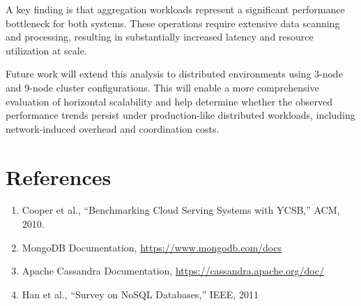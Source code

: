 \documentclass[12pt]{article}
\begin{document}
A key finding is that aggregation workloads represent a significant performance bottleneck for both systems. These operations require extensive data scanning and processing, resulting in substantially increased latency and resource utilization at scale.

Future work will extend this analysis to distributed environments using 3-node and 9-node cluster configurations. This will enable a more comprehensive evaluation of horizontal scalability and help determine whether the observed performance trends persist under production-like distributed workloads, including network-induced overhead and coordination costs.

\section{References}

\begin{enumerate}
\item Cooper et al., ``Benchmarking Cloud Serving Systems with YCSB,'' ACM, 2010.
\item MongoDB Documentation, \url{https://www.mongodb.com/docs}
\item Apache Cassandra Documentation, \url{https://cassandra.apache.org/doc/}
\item Han et al., ``Survey on NoSQL Databases,'' IEEE, 2011
\end{enumerate}
\end{document}
